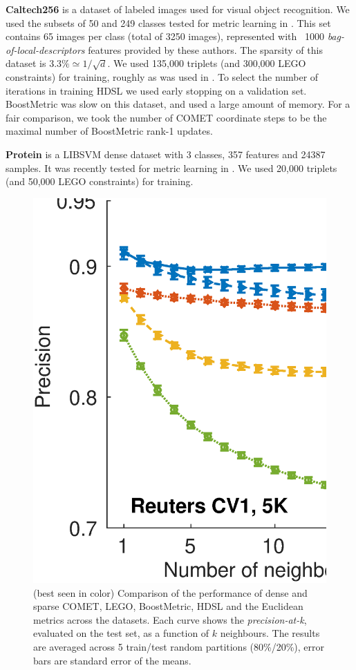 \documentclass[twoside,11pt]{article}
\begin{document}
\textbf{Caltech256} is a dataset of labeled images used for visual object recognition. We used the subsets of 50 and 249 classes tested for metric learning in \citep{OASIS}. This set contains 65 images per class (total of 3250 images), represented with ~1000 \textit{bag-of-local-descriptors} features provided by these authors. The sparsity of this dataset is $3.3\% \simeq 1/\sqrt{d}$. We used 135,000 triplets (and 300,000 LEGO constraints) for training, roughly as was used in \citep{OASIS}. To select the number of iterations in training HDSL we used early stopping on a validation set. BoostMetric was slow on this dataset, and used a large amount of memory. For a fair comparison, we took the number of COMET coordinate steps to be the maximal number of BoostMetric rank-1 updates.

\textbf{Protein} is a LIBSVM \citep{libsvm} dense dataset with 3 classes, 357 features and 24387 samples. It was recently tested for metric learning in \citep{qian}. We used 20,000 triplets (and 50,000 LEGO constraints) for training.
\begin{figure}[ht]
\centering
\includegraphics[width=12cm]{Precision_at_K_all_datasets}
\captionsetup{font=small}
\caption{(best seen in color) Comparison of the performance of dense and sparse COMET, LEGO, BoostMetric, HDSL and the Euclidean metrics across the datasets. Each curve shows the \textit{precision-at-k}, evaluated on the test set, as a function of $k$ neighbours. The results are averaged across 5 train/test random partitions (80\%/20\%), error bars are standard error of the means.}\label{precFig}
\end{figure}
\end{document}
